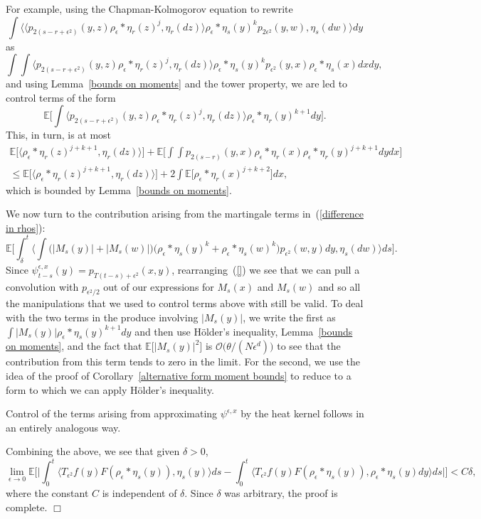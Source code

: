 \documentclass[12pt]{article}
\newenvironment {proof}{{\noindent\bf Proof }}{\hfill $\Box$ \medskip}
\newcommand{\IE}{\mathbb E}
\numberwithin{equation}{section}
\begin{document}
\begin{proof}
For example, using the Chapman-Kolmogorov equation to rewrite
\[
\int\Big\langle 
\big\langle p_{2(s-r+\epsilon^2)}(y,z)\rho_\epsilon*\eta_r(z)^j, \eta_r(dz)
\big\rangle
\rho_\epsilon*\eta_s(y)^k p_{2\epsilon^2}(y,w), \eta_s(dw)\Big\rangle dy
\]
as 
\[
\int\int
\big\langle p_{2(s-r+\epsilon^2)}(y,z)\rho_\epsilon*\eta_r(z)^j, \eta_r(dz)
\big\rangle
\rho_\epsilon*\eta_s(y)^k p_{\epsilon^2}(y,x)\rho_\epsilon*\eta_s(x) dx dy,
\]
and using Lemma~\ref{bounds on moments} and the tower property, we are led to 
control terms of the form
\[
\IE\Big[\int\big\langle p_{2(s-r+\epsilon^2)}(y,z)\rho_\epsilon*\eta_r(z)^j, 
\eta_r(dz)\big\rangle \rho_\epsilon*\eta_r(y)^{k+1} dy\Big].
\]
This, in turn, is at most
\begin{multline*}
\IE\Big[\big\langle \rho_\epsilon*\eta_r(z)^{j+k+1}, \eta_r(dz)\rangle\Big]
+\IE\Big[\int\int p_{2(s-r)}(y,x)\rho_\epsilon*\eta_r(x)
	\rho_\epsilon*\eta_r(y)^{j+k+1} dy dx\Big]
\\
\leq
\IE\Big[\big\langle \rho_\epsilon*\eta_r(z)^{j+k+1}, \eta_r(dz)\rangle\Big]
+2\int\IE\Big[\rho_\epsilon*\eta_r(x)^{j+k+2}\Big]dx,
\end{multline*} 
which is bounded by Lemma~\ref{bounds on moments}.

We now turn to the contribution arising from the martingale terms 
in~(\ref{difference in rhos}):
\[
\IE\Big[
\int_\delta^t\Big\langle\int 
\big(|M_s(y)|+|M_s(w)|\big)\big(\rho_\epsilon*\eta_s(y)^k+
\rho_\epsilon*\eta_s(w)^k\big)p_{\epsilon^2}(w,y)dy, \eta_s(dw)\Big\rangle ds
\Big] .
\]
Since $\psi_{t-s}^{\epsilon,x}(y)=p_{T(t-s)+\epsilon^2}(x,y)$, 
rearranging~(\ref{})
we see that we can pull a convolution with $p_{\epsilon^2/2}$ out of
our expressions for $M_s(x)$ and $M_s(w)$ and so all the manipulations 
that we used to control terms above with still be valid.
To deal with the two terms in the produce involving $|M_s(y)|$, we write 
the first as $\int |M_s(y)|\rho_\epsilon*\eta_s(y)^{k+1}dy$ and then use
H\"older's inequality, Lemma~\ref{bounds on moments}, and the fact
that $\IE\big[|M_s(y)|^2\big]$ is ${\mathcal O}\big(\theta/(N\epsilon^d)\big)$
to see that the contribution from this term tends to zero in the limit.
For the second, we use the idea of the proof of 
Corollary~\ref{alternative form moment bounds} to reduce to a form to which
we can apply H\"older's inequality.

Control of the terms arising from approximating $\psi^{\epsilon,x}$
by the heat kernel follows in an entirely analogous way.

Combining the above, we see that given $\delta>0$, 
\[
\lim_{\epsilon\to 0}\IE\Big[\Big|\int_0^t\big\langle T_{\epsilon^2} f(y) 
F(\rho_\epsilon *\eta_s(y)), \eta_s(y) \big\rangle ds 
- \int_0^t\big\langle T_{\epsilon^2} f(y) 
F(\rho_\epsilon * \eta_s(y)), \rho_\epsilon * \eta_s(y) dy 
\big\rangle ds\Big|\Big]
<C\delta,
\]
where the constant $C$ is independent of $\delta$.
Since $\delta$ was arbitrary, the proof is complete.
\end{proof}
\end{document}
